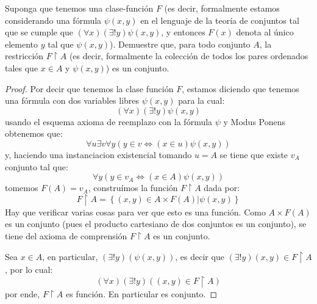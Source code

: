 \documentclass[12pt]{article}
\theoremstyle{largebreak}
\begin{document}
    \begin{excer}
        Suponga que tenemos una clase-función $F$ (es decir, formalmente estamos considerando una fórmula $\psi(x,y)$ en el lenguaje de la teoría de conjuntos tal que se cumple que $(\forall x)(\exists!y)\psi(x,y)$, y entonces $F(x)$ denota al único elemento $y$ tal que $\psi(x,y)$). Demuestre que, para todo conjunto $A$, la restricción $F\upharpoonright A$ (es decir, formalmente la colección de todos los pares ordenados tales que $x\in A$ y $\psi(x,y)$) es un conjunto.
    \end{excer}

    \begin{proof}
        Por decir que tenemos la clase función $F$, estamos diciendo que tenemos una fórmula con dos variables libres $\psi(x,y)$ para la cual:
        \begin{equation*}
            (\forall x)(\exists!y)\psi(x,y)
        \end{equation*}
        usando el esquema axioma de reemplazo con la fórmula $\psi$ y Modus Ponens obtenemos que:
        \begin{equation*}
            \forall u\exists v\forall y(y\in v\iff(x\in u)\psi(x,y))
        \end{equation*}
        y, haciendo una instanciacion existencial tomando $u=A$ se tiene que existe $v_A$ conjunto tal que:
        \begin{equation*}
            \forall y(y\in v_A\iff(x\in A)\psi(x,y))
        \end{equation*}
        tomemos $F(A)=v_A$, construímos la función $F\upharpoonright A$ dada por:
        \begin{equation*}
            F\upharpoonright A=\left\{(x,y)\in A\times F(A) \Big|\psi(x,y) \right\}
        \end{equation*}
        Hay que verificar varias cosas para ver que esto es una función. Como $A\times F(A)$ es un conjunto (pues el producto cartesiano de dos conjuntos es un conjunto), se tiene del axioma de comprensión $F\upharpoonright A$ es un conjunto.

        Sea $x\in A$, en particular, $(\exists !y)(\psi(x,y))$, es decir que $(\exists!y)(x,y)\in F\upharpoonright A$, por lo cual:
        \begin{equation*}
            (\forall x)(\exists!y)((x,y)\in F\upharpoonright A)
        \end{equation*}
        por ende, $F\upharpoonright A$ es función. En particular es conjunto.
    \end{proof}
\end{document}
